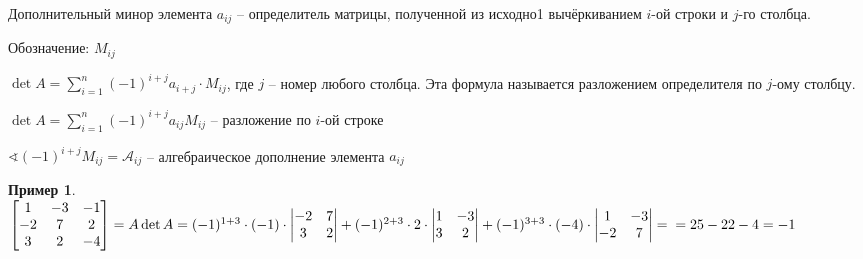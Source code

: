 \documentclass{book}
\theoremstyle{definition}
\newtheorem*{example}{Пример}
\begin{document}
    \begin{definition}
        Дополнительный минор элемента $a_{ij}$ -- определитель матрицы, полученной из исходно1 вычёркиванием $i$-ой строки и $j$-го столбца. 

        Обозначение: $M_{ij}$
    \end{definition}

    \begin{statement}

        $\det A = \sum\limits_{i=1}^{n} (-1)^{i+j}a_{i+j} \cdot M_{ij}$, где $j$ -- номер любого столбца. Эта формула называется разложением определителя по $j$-ому столбцу.

        $\det A = \sum_{i=1}^{n} (-1)^{i+j}a_{ij}M_{ij}$ -- разложение по $i$-ой строке
    \end{statement}

    $\sphericalangle (-1)^{i+j}M_{ij} = \mathcal{A}_{ij}$ -- алгебраическое дополнение элемента $a_{ij}$

    \begin{example}
        $\begin{bmatrix} 1 & -3 & -1\\ -2 & 7 & 2 \\ 3 & 2 & -4 \end{bmatrix} = A\quad \\ \det A = (-1)^{1+3}\cdot (-1)\cdot 
        \begin{vmatrix}
            -2 & 7\\ 3 & 2
        \end{vmatrix} + (-1)^{2+3}\cdot 2\cdot 
        \begin{vmatrix}
            1 & -3 \\ 3 & 2\\
        \end{vmatrix} + (-1)^{3+3}\cdot (-4)\cdot 
        \begin{vmatrix}
            1 & -3\\ -2 & 7\\
        \end{vmatrix} =\\ = 25 - 22  - 4 = -1$
    \end{example}
\end{document}
